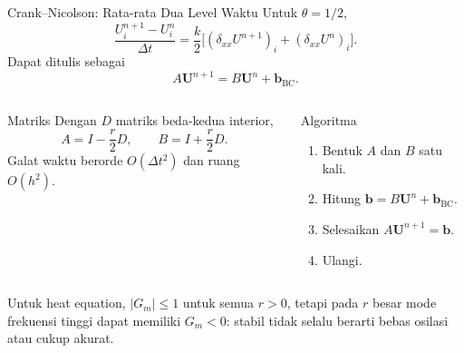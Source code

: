 \documentclass[aspectratio=169,10pt]{beamer}
\begin{document}
\begin{frame}{Crank--Nicolson: Rata-rata Dua Level Waktu}
\footnotesize
Untuk $\theta=1/2$,
\[
\frac{U_i^{n+1}-U_i^n}{\Delta t}
=\frac{k}{2}\Big[(\delta_{xx}U^{n+1})_i+(\delta_{xx}U^n)_i\Big].
\]
Dapat ditulis sebagai
\[
\boxed{A\mathbf U^{n+1}=B\mathbf U^n+\mathbf b_{\text{BC}}}.
\]
\begin{columns}[T,onlytextwidth]
\begin{block}{Matriks}
Dengan $D$ matriks beda-kedua interior,
\[
A=I-\frac{r}{2}D,
\qquad
B=I+\frac{r}{2}D.
\]
Galat waktu berorde $O(\Delta t^2)$ dan ruang $O(h^2)$.
\end{block}
\begin{block}{Algoritma}
\begin{enumerate}
  \item Bentuk $A$ dan $B$ satu kali.
  \item Hitung $\mathbf b=B\mathbf U^n+\mathbf b_{\text{BC}}$.
  \item Selesaikan $A\mathbf U^{n+1}=\mathbf b$.
  \item Ulangi.
\end{enumerate}
\end{block}
\end{columns}
Untuk heat equation, $|G_m|\le1$ untuk semua $r>0$, tetapi pada $r$ besar mode frekuensi tinggi dapat memiliki $G_m<0$: stabil tidak selalu berarti bebas osilasi atau cukup akurat.
\end{frame}
\end{document}
